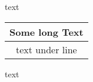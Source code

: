 \documentclass{standalone}
\makeatletter
\newcommand{\mycommand}[2]{\begin{tabular}[t]{@{} c @{}}
    #1\\  \hline
    #2
    \end{tabular}}
\makeatother
\begin{document}
    text \mycommand{Some long Text}{text under line} text
    
\end{document}
